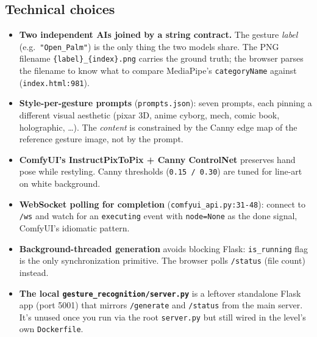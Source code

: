 \documentclass[11pt,a4paper]{article}
\begin{document}
\subsection{Technical choices}
\begin{itemize}[leftmargin=*,itemsep=4pt]
    \item \textbf{Two independent AIs joined by a string contract.} The gesture
    \emph{label} (e.g.\ \texttt{"Open\_Palm"}) is the only thing the two models
    share. The PNG filename \texttt{\{label\}\_\{index\}.png} carries the ground
    truth; the browser parses the filename to know what to compare MediaPipe's
    \texttt{categoryName} against (\texttt{index.html:981}).

    \item \textbf{Style-per-gesture prompts} (\texttt{prompts.json}): seven
    prompts, each pinning a different visual aesthetic (pixar 3D, anime cyborg,
    mech, comic book, holographic, \ldots). The \emph{content} is constrained
    by the Canny edge map of the reference gesture image, not by the prompt.

    \item \textbf{ComfyUI's InstructPixToPix + Canny ControlNet} preserves hand
    pose while restyling. Canny thresholds (\texttt{0.15 / 0.30}) are tuned for
    line-art on white background.

    \item \textbf{WebSocket polling for completion}
    (\texttt{comfyui\_api.py:31-48}): connect to \texttt{/ws} and watch for an
    \texttt{executing} event with \texttt{node=None} as the done signal, ComfyUI's idiomatic pattern.

    \item \textbf{Background-threaded generation} avoids blocking Flask:
    \texttt{is\_running} flag is the only synchronization primitive. The browser
    polls \texttt{/status} (file count) instead.

    \item \textbf{The local \texttt{gesture\_recognition/server.py}} is a leftover
    standalone Flask app (port 5001) that mirrors \texttt{/generate} and
    \texttt{/status} from the main server. It's unused once you run via the root
    \texttt{server.py} but still wired in the level's own \texttt{Dockerfile}.
\end{itemize}
\end{document}
